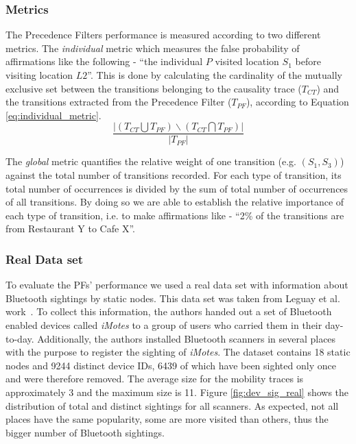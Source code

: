 \subsubsection{Metrics}

The Precedence Filters performance is measured according to two
different metrics. The \emph{individual} metric which measures the
false probability of affirmations like the following - ``the
individual $P$ visited location $S_1$ before visiting location
$L2$''. This is done by calculating the cardinality of the mutually
exclusive set between the transitions belonging to the causality trace
($T_{CT}$) and the transitions extracted from the Precedence Filter
($T_{PF}$), according to Equation \ref{eq:individual_metric}.
 \begin{equation}
   \label{eq:individual_metric}
   \frac{ | (T_{CT} \bigcup T_{PF}) \backslash (T_{CT} \bigcap T_{PF}) | }{|T_{PF}|}
 \end{equation}

The \emph{global} metric quantifies the relative weight of one transition
(e.g. $(S_1,S_3)$) against the total number of transitions
recorded. For each type of transition, its total number of occurrences
is divided by the sum of total number of occurrences of all
transitions. By doing so we are able to establish the relative
importance of each type of transition, i.e. to make affirmations like
- ``2\% of the transitions are from Restaurant Y to Cafe X''. 

\subsubsection{Real Data set}

To evaluate the PFs' performance we used a real data set with
information about Bluetooth sightings by static nodes. This data set
was taken from Leguay et al. work~\cite{leguay2006opportunistic}. To
collect this information, the authors handed out a set of Bluetooth
enabled devices called \emph{iMotes} to a group of users who carried
them in their day-to-day. Additionally, the authors installed
Bluetooth scanners in several places with the purpose to register the
sighting of \emph{iMotes}. The dataset contains 18 static nodes and
9244 distinct device IDs, 6439 of which have been sighted only once
and were therefore removed. The average size for the mobility traces
is approximately 3 and the maximum size is 11. Figure
\ref{fig:dev_sig_real} shows the distribution of total and distinct
sightings for all scanners. As expected, not all places have the same
popularity, some are more visited than others, thus the bigger number
of Bluetooth sightings.

